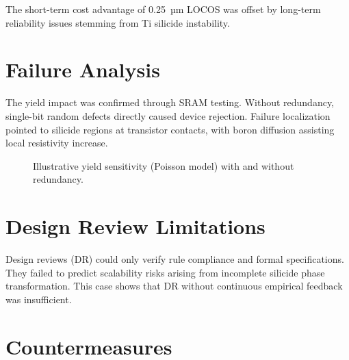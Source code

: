 \documentclass[conference]{IEEEtran}
\begin{document}
The short-term cost advantage of 0.25~µm LOCOS was offset by long-term reliability issues stemming from Ti silicide instability.

\section{Failure Analysis}
The yield impact was confirmed through SRAM testing. 
Without redundancy, single-bit random defects directly caused device rejection. 
Failure localization pointed to silicide regions at transistor contacts, with boron diffusion assisting local resistivity increase.

\begin{figure}[!t]
  \centering
  \caption{Illustrative yield sensitivity (Poisson model) with and without redundancy.}
  \label{fig:yield}
\end{figure}

\section{Design Review Limitations}
Design reviews (DR) could only verify rule compliance and formal specifications. 
They failed to predict scalability risks arising from incomplete silicide phase transformation. 
This case shows that DR without continuous empirical feedback was insufficient.

\section{Countermeasures}
\end{document}
